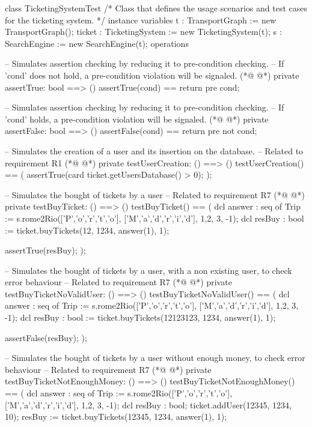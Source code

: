 \begin{vdmpp}[breaklines=true]
class TicketingSystemTest
/*
  Class that defines the usage scenarios and test cases for the ticketing system.
*/
instance variables
 t : TransportGraph := new TransportGraph();
 ticket : TicketingSystem := new TicketingSystem(t);
 s : SearchEngine := new SearchEngine(t);
operations

 -- Simulates assertion checking by reducing it to pre-condition checking.
 -- If 'cond' does not hold, a pre-condition violation will be signaled.
(*@
\label{assertTrue:13}
@*)
 private assertTrue: bool ==> ()
  assertTrue(cond) == return
  pre cond;
  
  -- Simulates assertion checking by reducing it to pre-condition checking.
 -- If 'cond' holds, a pre-condition violation will be signaled.
(*@
\label{assertFalse:19}
@*)
  private assertFalse: bool ==> ()
  assertFalse(cond) == return
  pre not cond;
  
  -- Simulates the creation of a user and its insertion on the database.
  -- Related to requirement R1
(*@
\label{testUserCreation:25}
@*)
  private testUserCreation: () ==> ()
 testUserCreation() == (
   assertTrue(card ticket.getUsersDatabase() > 0);
 );
 
 -- Simulates the bought of tickets by a user
  -- Related to requirement R7
(*@
\label{testBuyTicket:32}
@*)
 private testBuyTicket: () ==> ()
 testBuyTicket() == (
  dcl answer : seq of Trip := s.rome2Rio(['P','o','r','t','o'], ['M','a','d','r','i','d'], {1,2}, 3, -1);
  dcl resBuy : bool := ticket.buyTickets(12, 1234, answer(1), 1);
  
  assertTrue(resBuy);
 );
 
 -- Simulates the bought of tickets by a user, with a non existing user, to check error behaviour
  -- Related to requirement R7
(*@
\label{testBuyTicketNoValidUser:42}
@*)
 private testBuyTicketNoValidUser: () ==> ()
 testBuyTicketNoValidUser() == (
  dcl answer : seq of Trip := s.rome2Rio(['P','o','r','t','o'], ['M','a','d','r','i','d'], {1,2}, 3, -1);
  dcl resBuy : bool := ticket.buyTickets(12123123, 1234, answer(1), 1);
  
  assertFalse(resBuy);
 );
 
 -- Simulates the bought of tickets by a user without enough money, to check error behaviour
  -- Related to requirement R7
(*@
\label{testBuyTicketNotEnoughMoney:52}
@*)
 private testBuyTicketNotEnoughMoney: () ==> ()
 testBuyTicketNotEnoughMoney() == (
  dcl answer : seq of Trip := s.rome2Rio(['P','o','r','t','o'], ['M','a','d','r','i','d'], {1,2}, 3, -1);
  dcl resBuy : bool;
  ticket.addUser(12345, 1234, 10);
  resBuy := ticket.buyTickets(12345, 1234, answer(1), 1);
  

\end{vdmpp}
